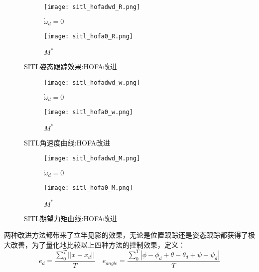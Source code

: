 \begin{figure}[H]
  \centering
\begin{subfigure}[b]{0.49\linewidth}
    \texttt{[image: sitl\_hofadwd\_R.png]}
    \caption{$\dot \omega_d =0$}
\end{subfigure}
\hfill
\begin{subfigure}[b]{0.49\linewidth}
    \texttt{[image: sitl\_hofa0\_R.png]}
    \caption{$M^*$}
\end{subfigure}
\caption{SITL姿态跟踪效果:HOFA改进}
\end{figure}

\begin{figure}[H]
  \centering
\begin{subfigure}[b]{0.49\linewidth}
    \texttt{[image: sitl\_hofadwd\_w.png]}
    \caption{$\dot \omega_d =0$}
\end{subfigure}
\hfill
\begin{subfigure}[b]{0.49\linewidth}
    \texttt{[image: sitl\_hofa0\_w.png]}
    \caption{$M^*$}
\end{subfigure}
\caption{SITL角速度曲线:HOFA改进}
\end{figure}


\begin{figure}[H]
  \centering
\begin{subfigure}[b]{0.49\linewidth}
    \texttt{[image: sitl\_hofadwd\_M.png]}
    \caption{$\dot \omega_d =0$}
\end{subfigure}
\hfill
\begin{subfigure}[b]{0.49\linewidth}
    \texttt{[image: sitl\_hofa0\_M.png]}
    \caption{$M^*$}
\end{subfigure}
\caption{SITL期望力矩曲线:HOFA改进}
\end{figure}

两种改进方法都带来了立竿见影的效果，无论是位置跟踪还是姿态跟踪都获得了极大改善，为了量化地比较以上四种方法的控制效果，定义：
$$e_d=\frac{\sum_0^{T}||x-x_d||}{T} \quad e_{angle}=\frac{\sum_0^{T}|\phi-\phi_d+\theta-\theta_d+\psi-\psi_d|}{T}$$

